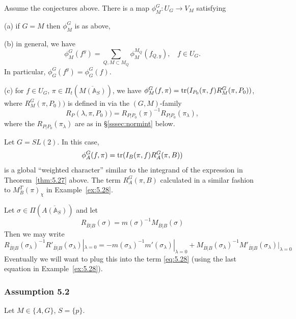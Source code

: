 \begin{theorem}\label{thm:6.5} Assume the conjectures above.
There is a map $\phi^G_M :U_G\rightarrow V_M$ satisfying

(a) if $G=M$ then $\phi^G_M$ is as above,

(b) in general, we have
\[
\phi_M^G(f^y)=
\sum_{Q ,M\subset M_Q}
\phi_M^{M_Q}(f_{Q,y}),\ \ \ \ f\in U_G.
\]
In particular, $\phi_G^G(f^y)=\phi_G^G(f)$.

(c) for $f\in U_G$, $\pi\in \Pi_t(\overline{M({\mathbb{A}}_S)})$,
we have $\phi^G_M(f,\pi)={\rm tr}(I_{P_0}(\pi,f)R_M^G(\pi,P_0))$,
where $R_M^G(\pi,P_0))$ is defined in \cite[section 7]{A6}
via the $(G,M)$-family
\[
R_P(\lambda, \pi,P_0))=
R_{P|P_0}(\pi)^{-1}R_{P|P_0}(\pi_\lambda),
\]
where the $R_{P|P_0}(\pi_\lambda)$ are as in \S\ref{sssec:normint} below.
\end{theorem}

\begin{example}\label{ex:6.6} Let $G=SL(2)$. In this case,
\[
\phi^G_A(f,\pi)={\rm tr}(I_{B}(\pi,f)R_A^G(\pi,B))
\]
is a global ``weighted character'' similar to the integrand of
the expression in Theorem~\ref{thm:5.27} above. The term $R_A^G(\pi,B)$
calculated in a similar fashion to $M_B^T(\pi)_\chi$
in Example~\ref{ex:5.28}.
\end{example}

Let $\sigma\in \Pi(\overline{A({\mathbb{A}}_S)})$ and let
\[
R_{\overline{B}|B}(\sigma)
=m(\sigma)^{-1}M_{\overline{B}|B}(\sigma)
\]
Then we may write 
\[
R_{\overline{B}|B}(\sigma_\lambda)^{-1}
R'_{\overline{B}|B}(\sigma_\lambda)|_{\lambda =0}
=-m(\sigma_\lambda)^{-1}m'(\sigma_\lambda)|_{\lambda =0}
+M_{\overline{B}|B}(\sigma_\lambda)^{-1}
M'_{\overline{B}|B}(\sigma_\lambda)|_{\lambda =0}
\]
Eventually we will want to plug this into the term \eqref{eq:5.28}
(using the last equation in Example~\ref{ex:5.28}). 

\subsubsection{Assumption 5.2}\label{sssec:ass52}

Let $M\in \{A,G\}$, $S=\{p\}$.

